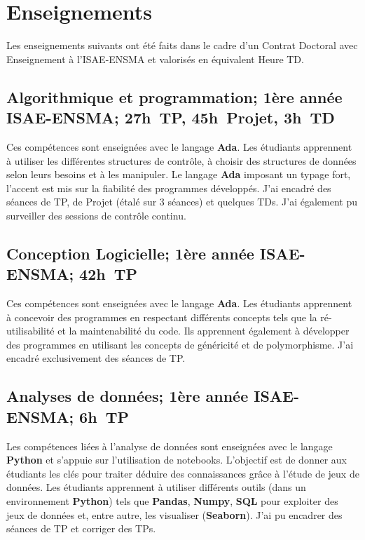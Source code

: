\documentclass[11pt,a4paper,oneside]{article}
\begin{document}
\section{Enseignements}

Les enseignements suivants ont été faits dans le cadre d'un Contrat Doctoral avec
Enseignement à l'ISAE-ENSMA et valorisés en équivalent Heure TD.

\subsection{Algorithmique et programmation; 1ère année ISAE-ENSMA; 27h~TP,
	45h~Projet, 3h~TD}

Ces compétences sont enseignées avec le langage \textbf{Ada}. %
Les étudiants apprennent à utiliser les différentes structures de contrôle, à
choisir des structures de données selon leurs besoins et à les manipuler. %
Le langage \textbf{Ada} imposant un typage fort, l'accent est mis sur la
fiabilité des programmes développés. %
J'ai encadré des séances de TP, de Projet (étalé sur 3 séances) et
quelques TDs. %
J'ai également pu surveiller des sessions de contrôle continu. %

\subsection{Conception Logicielle; 1ère année ISAE-ENSMA; 42h~TP}
Ces compétences sont enseignées avec le langage \textbf{Ada}. %
Les étudiants apprennent à concevoir des programmes en respectant différents
concepts tels que la ré-utilisabilité et la maintenabilité du code. %
Ils apprennent également à développer des programmes en utilisant les concepts
de généricité et de polymorphisme. %
J'ai encadré exclusivement des séances de TP. %

\subsection{Analyses de données; 1ère année ISAE-ENSMA; 6h~TP}
Les compétences liées à l'analyse de données sont enseignées avec le langage
\textbf{Python} et s'appuie sur l'utilisation de notebooks. %
L'objectif est de donner aux étudiants les clés pour traiter déduire des
connaissances grâce à l'étude de jeux de données. %
Les étudiants apprennent à utiliser différents outils (dans un environnement
\textbf{Python}) tels que \textbf{Pandas}, \textbf{Numpy}, \textbf{SQL} pour
exploiter des jeux de données et, entre autre, les visualiser
(\textbf{Seaborn}). %
J'ai pu encadrer des séances de TP et corriger des TPs.
\end{document}
